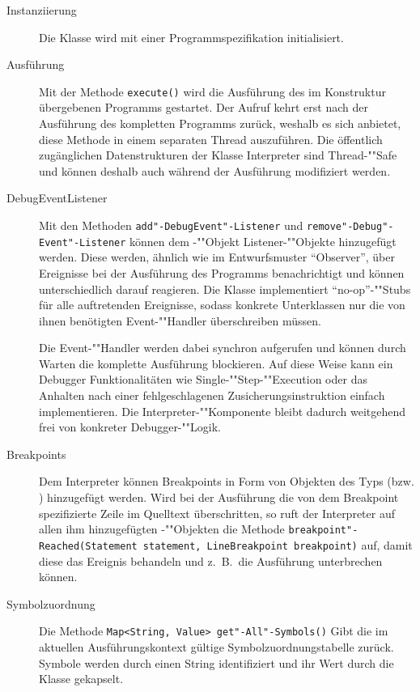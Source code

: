 \begin{description}
    \item[Instanziierung] Die Klasse  wird mit einer Programmspezifikation initialisiert.

    \item[Ausführung] Mit der Methode \texttt{execute()} wird die Ausführung des im Konstruktur übergebenen Programms gestartet. Der Aufruf kehrt erst nach der Ausführung des kompletten Programms zurück, weshalb es sich anbietet, diese Methode in einem separaten Thread auszuführen. Die öffentlich zugänglichen Datenstrukturen der Klasse Interpreter sind Thread-""Safe und können deshalb auch während der Ausführung modifiziert werden.

    \item[DebugEventListener]
    Mit den Methoden \texttt{add"-DebugEvent"-Listener} und \texttt{remove"-Debug"-Event"-Listener} können dem -""Objekt Listener-""Objekte hinzugefügt werden. Diese werden, ähnlich wie im Entwurfsmuster ``Observer'', über Ereignisse bei der Ausführung des Programms benachrichtigt und können unterschiedlich darauf reagieren. Die Klasse  implementiert ``no-op''-""Stubs für alle auftretenden Ereignisse, sodass konkrete Unterklassen nur die von ihnen benötigten Event-""Handler überschreiben müssen.

    Die Event-""Handler werden dabei synchron aufgerufen und können durch Warten die komplette Ausführung blockieren. Auf diese Weise kann ein Debugger Funktionalitäten wie Single-""Step-""Execution oder das Anhalten nach einer fehlgeschlagenen Zusicherungsinstruktion einfach implementieren. Die Interpreter-""Komponente bleibt dadurch weitgehend frei von konkreter Debugger-""Logik.

    \item[Breakpoints]
    Dem Interpreter können Breakpoints in Form von Objekten des Typs  (bzw. ) hinzugefügt werden. Wird bei der Ausführung die von dem Breakpoint spezifizierte Zeile im Quelltext überschritten, so ruft der Interpreter auf allen ihm hinzugefügten -""Objekten die Methode \texttt{breakpoint"-Reached(Statement statement, LineBreakpoint breakpoint)} auf, damit diese das Ereignis behandeln und z.~B.\ die Ausführung unterbrechen können.

    \item[Symbolzuordnung]
    Die Methode \texttt{Map<String, Value> get"-All"-Symbols()} Gibt die im aktuellen Ausführungskontext gültige Symbolzuordnungstabelle zurück. Symbole werden durch einen String identifiziert und ihr Wert durch die Klasse  gekapselt.


\end{description}
